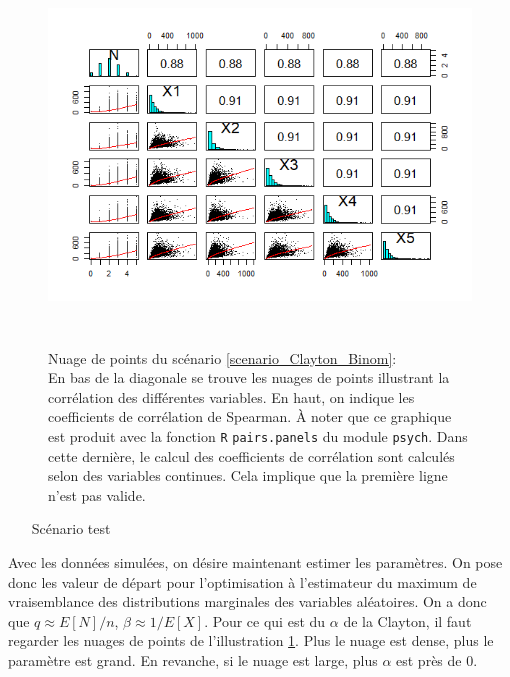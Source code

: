 \documentclass{article}
\begin{document}
	\begin{figure}[H]
		\centering
		\includegraphics[height=10cm]{Graph/scatterplot_Binom.png}
		\caption[Nuage de points avec copule de Clayton, $N\sim Binom(5, 2/5)$ et $X\sim Exp(1/100)$]
		{Nuage de points du scénario \ref{scenario_Clayton_Binom}: \\
			En bas de la diagonale se trouve les nuages de points illustrant la corrélation des différentes variables. En haut, on indique les coefficients de corrélation de Spearman. À noter que ce graphique est produit avec la fonction \texttt{R} \texttt{pairs.panels} du module \texttt{psych}. Dans cette dernière, le calcul des coefficients de corrélation sont calculés selon des variables continues. Cela implique que la première ligne n'est pas valide.}
		\label{graph_scatterplot_Binom}
	\end{figure}
	
	\begin{enumerate}
		\item[Scénario]  test
	\end{enumerate}
	
	
	Avec les données simulées, on désire maintenant estimer les paramètres. On pose donc les valeur de départ pour l'optimisation à l'estimateur du maximum de vraisemblance des distributions marginales des variables aléatoires. On a donc que $q \approx E[N]/n$, $\beta \approx 1/E[X]$. Pour ce qui est du $\alpha$ de la Clayton, il faut regarder les nuages de points de  l'illustration \ref{graph_scatterplot_Binom}. Plus le nuage est dense, plus le paramètre est grand. En revanche, si le nuage est large, plus $\alpha$ est près de 0.\\
	
\end{document}
